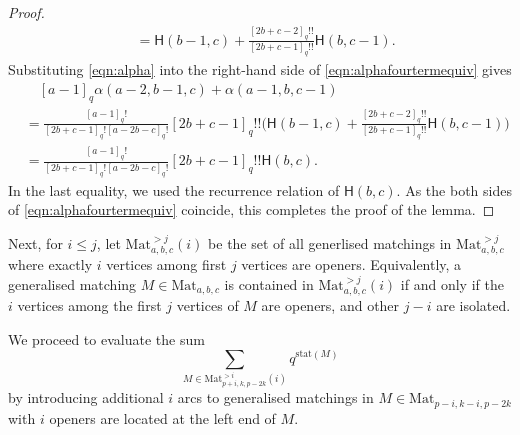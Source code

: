 \documentclass{amsart}
\theoremstyle{plain}
\theoremstyle{remark}
\numberwithin{equation}{section}
\begin{document}
\begin{proof}
\begin{align*}
        &=\mathsf{H}(b-1,c)+\frac{[2b+c-2]_{q}!!}{[2b+c-1]_{q}!!} \mathsf{H}(b,c-1).
    \end{align*}
    Substituting \eqref{eqn:alpha} into the right-hand side of \eqref{eqn:alphafourtermequiv} gives
    \begin{align*}
        &\quad [a-1]_{q}\alpha(a-2,b-1,c)+\alpha(a-1,b,c-1)\\
        &=\frac{[a-1]_{q}!}{[2b+c-1]_{q}![a-2b-c]_{q}!}[2b+c-1]_{q}!!\Big(\mathsf{H}(b-1,c)+\frac{[2b+c-2]_{q}!!}{[2b+c-1]_{q}!!}\mathsf{H}(b,c-1) \Big)\\
        &=\frac{[a-1]_{q}!}{[2b+c-1]_{q}![a-2b-c]_{q}!}[2b+c-1]_{q}!!\mathsf{H}(b,c).
    \end{align*}
    In the last equality, we used the recurrence relation of $\mathsf H(b,c)$. As the both sides of \eqref{eqn:alphafourtermequiv} coincide, this completes the proof of the lemma.
\end{proof}

Next, for $i\leq j$, let ${\mathrm{Mat}}_{a,b,c}^{>j}(i)$ be the set of all generlised matchings in ${\mathrm{Mat}}_{a,b,c}^{>j}$ where exactly $i$ vertices among first $j$ vertices are openers. Equivalently, a generalised matching $M\in{\mathrm{Mat}}_{a,b,c}$ is contained in ${\mathrm{Mat}}_{a,b,c}^{>j}(i)$ if and only if the $i$ vertices among the first $j$ vertices of $M$ are openers, and other $j-i$ are isolated.

We proceed to evaluate the sum
\begin{equation}
    \sum_{M\in{\mathrm{Mat}}_{p+i,k,p-2k}^{>i}(i)}q^{\mathrm{stat}(M)}
\end{equation}
by introducing additional $i$ arcs to generalised matchings in $M\in{\mathrm{Mat}}_{p-i,k-i,p-2k}$ with $i$ openers are located at the left end of $M$. 
\end{document}

